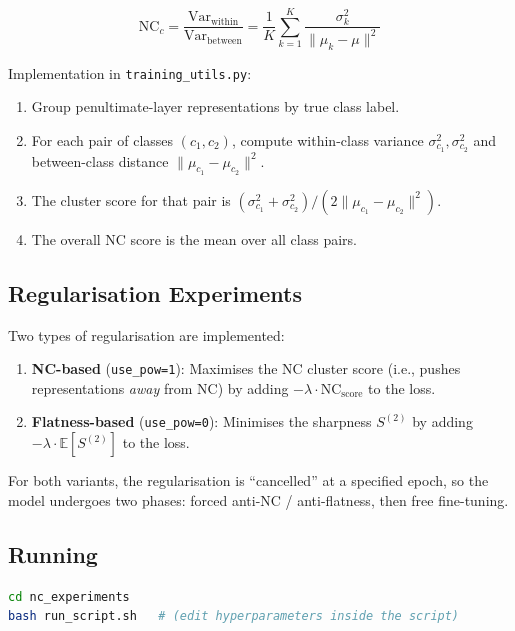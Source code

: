 \documentclass[11pt,a4paper]{article}
\theoremstyle{definition}
\begin{document}
\begin{equation}
\text{NC}_c = \frac{\text{Var}_{\text{within}}}{\text{Var}_{\text{between}}}
= \frac{1}{K} \sum_{k=1}^K \frac{\sigma_k^2}{\|\mu_k - \mu\|^2}
\label{eq:nc_metric}
\end{equation}

Implementation in \texttt{training\_utils.py}:
\begin{enumerate}[leftmargin=*]
    \item Group penultimate-layer representations by true class label.
    \item For each pair of classes $(c_1, c_2)$, compute within-class variance $\sigma^2_{c_1}, \sigma^2_{c_2}$
          and between-class distance $\|\mu_{c_1} - \mu_{c_2}\|^2$.
    \item The cluster score for that pair is $(\sigma^2_{c_1} + \sigma^2_{c_2}) / (2 \|\mu_{c_1} - \mu_{c_2}\|^2)$.
    \item The overall NC score is the mean over all class pairs.
\end{enumerate}

\subsection{Regularisation Experiments}
Two types of regularisation are implemented:
\begin{enumerate}[leftmargin=*]
    \item \textbf{NC-based} (\texttt{use\_pow=1}): Maximises the NC cluster score (i.e., pushes
          representations \emph{away} from NC) by adding $-\lambda \cdot \text{NC}_{\text{score}}$
          to the loss.
    \item \textbf{Flatness-based} (\texttt{use\_pow=0}): Minimises the sharpness $S^{(2)}$ by adding
          $-\lambda \cdot \mathbb{E}[S^{(2)}]$ to the loss.
\end{enumerate}

For both variants, the regularisation is ``cancelled'' at a specified epoch,
so the model undergoes two phases: forced anti-NC / anti-flatness, then free fine-tuning.

\subsection{Running}
\begin{lstlisting}[language=bash]
cd nc_experiments
bash run_script.sh   # (edit hyperparameters inside the script)
\end{lstlisting}
\end{document}
